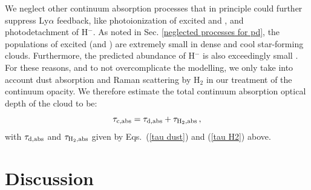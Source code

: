 \documentclass[fleqn,usenatbib]{mnras}
\newcommand\HI{\ion{H}{I}\xspace} %
\newcommand\HeI{\ion{He}{I}\xspace} %
\begin{document}
We neglect other continuum absorption processes that in principle could further suppress Ly$\alpha$ feedback, like photoionization of excited \HI and \HeI, and photodetachment of H$^{-}$. As noted in Sec. \ref{neglected processes for pd}, the populations of excited \HI (and \HeI) are extremely small in dense and cool star-forming clouds. Furthermore, the predicted abundance of H$^{-}$ is also exceedingly small \citep[e.g.][]{Dijkstra2016, Nebrin2023cooling}. For these reasons, and to not overcomplicate the modelling, we only take into account dust absorption and Raman scattering by H$_2$ in our treatment of the continuum opacity. We therefore estimate the total continuum absorption optical depth of the cloud to be:
\begin{equation}
    \tau_{\rm c, abs} = \tau_{\rm d,abs} +  \tau_{\rm H_2,abs}\, ,
\end{equation}
with $\tau_{\rm d,abs}$ and $\tau_{\rm H_2,abs}$ given by Eqs.~(\ref{tau dust}) and (\ref{tau H2}) above. 


\section{Discussion}
\label{Discussion section}
\end{document}
